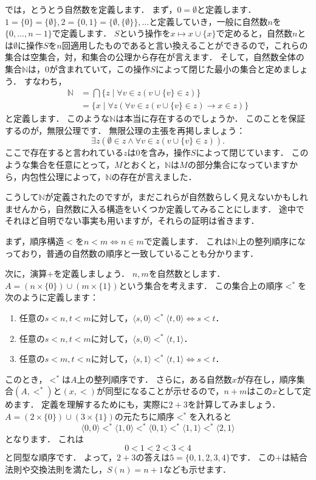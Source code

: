 \documentclass[./main]{subfiles}
\newcommand{\mbb}{\mathbb}
\begin{document}
では，とうとう自然数を定義します．
まず，$0=\emptyset$と定義します．
$1=\{0\}=\{\emptyset\}, 2=\{0, 1\}=\{\emptyset,\{\emptyset\}\},\ldots$と定義していき，一般に自然数$n$を$\{0,\ldots,n-1\}$で定義します．
$S$という操作を$x\mapsto x\cup\{x\}$で定めると，自然数$n$とは$\emptyset$に操作$S$を$n$回適用したものであると言い換えることができるので，これらの集合は空集合，対，和集合の公理から存在が言えます．
そして，自然数全体の集合$\mbb{N}$は，$0$が含まれていて，この操作$S$によって閉じた最小の集合と定めましょう．
すなわち，
\begin{align*}
\mbb{N} &=\bigcap\{z\mid\forall v\in z(v\cup\{v\}\in z)\}\\
&=\{x\mid\forall z(\forall v\in z(v\cup\{v\}\in z)\to x\in z)\}
\end{align*}
と定義します．
このような$\mbb{N}$は本当に存在するのでしょうか．
このことを保証するのが，無限公理です．
無限公理の主張を再掲しましょう：
\[
\exists z(\emptyset\in z\wedge\forall v\in z(v\cup\{v\}\in z)).
\]
ここで存在すると言われている$z$は0を含み，操作$S$によって閉じています．
このような集合を任意にとって，$M$とおくと，$\mbb{N}$は$M$の部分集合になっていますから，内包性公理によって，$\mbb{N}$の存在が言えました．

こうして$\mbb{N}$が定義されたのですが，まだこれらが自然数らしく見えないかもしれませんから，自然数に入る構造をいくつか定義してみることにします．
途中でそれほど自明でない事実も用いますが，それらの証明は省きます．

まず，順序構造$<$を$n<m\iff n\in m$で定義します．
これは$\mbb{N}$上の整列順序になっており，普通の自然数の順序と一致していることも分かります．

次に，演算$+$を定義しましょう．
$n, m$を自然数とします．
$A=(n\times\{0\})\cup(m\times\{1\})$という集合を考えます．
この集合上の順序$<^{*}$を次のように定義します：
\begin{enumerate}
\item 任意の$s<n, t<m$に対して，$\langle s, 0\rangle <^{*}\langle t, 0\rangle\iff s<t$．
\item 任意の$s<n, t<m$に対して，$\langle s, 0\rangle <^{*} \langle t, 1\rangle$．
\item 任意の$s<m, t<n$に対して，$\langle s, 1\rangle <^{*}\langle t, 1\rangle\iff s<t$．
\end{enumerate}
このとき，$<^{*}$は$A$上の整列順序です．
さらに，ある自然数$x$が存在し，順序集合$(A, <^{*})$と$(x, <)$が同型になることが示せるので，$n+m$はこの$x$として定めます．
定義を理解するためにも，実際に$2+3$を計算してみましょう．
$A=(2\times\{0\})\cup(3\times\{1\})$の元たちに順序$<^{*}$を入れると
\[
\langle 0, 0\rangle <^{*} \langle 1, 0\rangle <^{*} \langle 0, 1\rangle <^{*} \langle 1, 1 \rangle <^{*} \langle 2, 1 \rangle
\]
となります．
これは
\[
0 < 1 < 2 < 3 < 4
\]
と同型な順序です．
よって，$2+3$の答えは$5=\{0, 1, 2, 3, 4\}$です．
この$+$は結合法則や交換法則を満たし，$S(n)=n+1$なども示せます．
\end{document}
